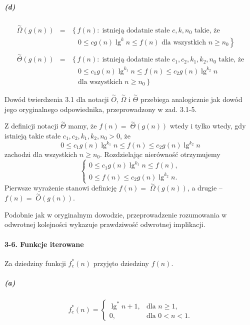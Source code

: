 \subparagraph{(d)}
\begin{eqnarray*}
  \stackrel{\sim}{\Omega}\!\!(g(n)) &=& \left\{f(n):\;\mbox{istnieją dodatnie stałe }c,k,n_0\mbox{ takie, że}\right. \\
  && \quad 0\le cg(n)\lg^kn\le f(n)\mbox{ dla wszystkich }n\ge n_0\left.\right\} \\\\
  \stackrel{\sim}{\Theta}\!\!(g(n)) &=& \left\{f(n):\;\mbox{istnieją dodatnie stałe }c_1,c_2,k_1,k_2,n_0\mbox{ takie, że}\right. \\
  && \quad 0\le c_1g(n)\lg^{k_1}n\le f(n)\le c_2g(n)\lg^{k_2}n \\
  && \left.\quad\mbox{dla wszystkich }n\ge n_0\right\}
\end{eqnarray*}

Dowód twierdzenia 3.1 dla notacji $\stackrel{\sim}{O}$, $\stackrel{\sim}{\Omega}$ i $\stackrel{\sim}{\Theta}$ przebiega analogicznie jak dowód jego oryginalnego odpowiednika, przeprowadzony w zad. 3.1-5.

Z definicji notacji $\stackrel{\sim}{\Theta}$ mamy, że $f(n)=\;\stackrel{\sim}{\Theta}\!\!(g(n))$ wtedy i tylko wtedy, gdy istnieją takie stałe $c_1,c_2,k_1,k_2,n_0>0$, że
\[
  0\le c_1g(n)\lg^{k_1}n\le f(n)\le c_2g(n)\lg^{k_2}n
\]
zachodzi dla wszystkich $n\ge n_0$. Rozdzielając nierówność otrzymujemy
\[
  \left\{\begin{array}{r}
	0\le c_1g(n)\lg^{k_1}n\le f(n), \\
	0\le f(n)\le c_2g(n)\lg^{k_2}n.
  \end{array}\right.
\]
Pierwsze wyrażenie stanowi definicję $f(n)=\;\stackrel{\sim}{\Omega}\!\!(g(n))$, a drugie -- $f(n)=\;\stackrel{\sim}{O}\!\!(g(n))$.

Podobnie jak w oryginalnym dowodzie, przeprowadzenie rozumowania w odwrotnej kolejności wykazuje prawdziwość odwrotnej implikacji.

\paragraph{3-6. Funkcje iterowane}

Za dziedziny funkcji $f_c^*(n)$ przyjęto dziedziny $f(n)$.

\subparagraph{(a)}
\[
  f_c^*(n)=\left\{\begin{array}{ll}
	\lg^*n+1, & \mbox{dla }n\ge 1, \\
	0, & \mbox{dla }0<n<1.
  \end{array}\right.
\]

